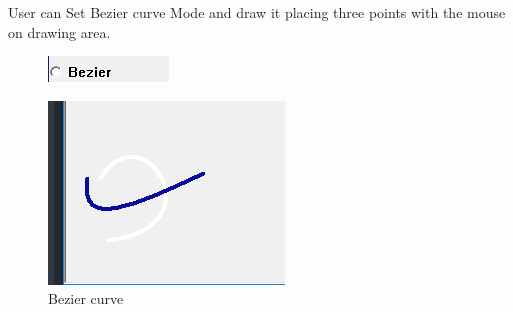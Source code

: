 \documentclass[12pt]{article}
\begin{document}
        User can Set Bezier curve Mode and draw it placing three points with the mouse on drawing area.
        \begin{figure}[H]
                \centering
                \includegraphics[width=.5\textwidth]{img3.png}
           
        \end{figure}
        \begin{figure}[H]
                \centering
                \includegraphics[width=.5\textwidth]{img4.png}
                \caption{Bezier curve}
        \end{figure}
        \vspace{0.5 cm}
\end{document}
